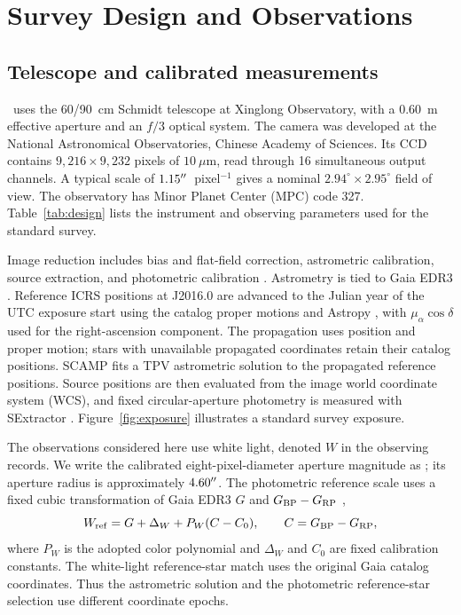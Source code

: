 \section{Survey Design and Observations}
\label{sec:survey}

\subsection{Telescope and calibrated measurements}
\label{sec:facility}

\SHARP\ uses the 60/90~cm Schmidt telescope at Xinglong Observatory,
with a 0.60~m effective aperture and an $f/3$ optical system. The camera
was developed at the National Astronomical Observatories, Chinese
Academy of Sciences. Its CCD contains $9,216\times9,232$ pixels of
$10~\mu$m, read through 16 simultaneous output channels. A typical
scale of $1.15^{\prime\prime}$~pixel$^{-1}$ gives a nominal
$2.94^\circ\times2.95^\circ$ field of view. The observatory has Minor
Planet Center (MPC) code 327. Table~\ref{tab:design} lists the instrument
and observing parameters used for the standard survey.

Image reduction includes bias and flat-field correction, astrometric
calibration, source extraction, and photometric calibration
\citep[in preparation]{Li2026InPrep}. Astrometry is tied to Gaia EDR3
\citep{GaiaEDR32021,Lindegren2021EDR3}. Reference ICRS positions at
J2016.0 are advanced to the Julian year of the UTC exposure start using
the catalog proper motions and Astropy \citep{Astropy2022}, with
$\mu_\alpha\cos\delta$ used for the right-ascension component. The
propagation uses position and proper motion; stars with unavailable
propagated coordinates retain their catalog positions. SCAMP
\citep{Bertin2006SCAMP} fits a TPV astrometric solution to the propagated
reference positions. Source positions are then evaluated from the
image world coordinate system (WCS), and fixed circular-aperture
photometry is measured with SExtractor \citep{BertinArnouts1996}.
Figure~\ref{fig:exposure} illustrates a standard survey exposure.

The observations considered here use white light, denoted $W$ in the
observing records. We write the calibrated eight-pixel-diameter aperture
magnitude as \gaper; its aperture radius is approximately $4.60^{\prime\prime}$.
The photometric reference scale uses a fixed cubic transformation of
Gaia EDR3 $G$ and $G_{\rm BP}-G_{\rm RP}$
\citep{Riello2021EDR3,Li2026InPrep},
\begin{equation}
W_{\rm ref}=G+\Delta_W+P_W(C-C_0),\qquad
C=G_{\rm BP}-G_{\rm RP},
\label{eq:color}
\end{equation}
where $P_W$ is the adopted color polynomial and $\Delta_W$ and $C_0$
are fixed calibration constants. The white-light reference-star
match uses the original Gaia catalog coordinates. Thus the
astrometric solution and the photometric reference-star selection
use different coordinate epochs.

